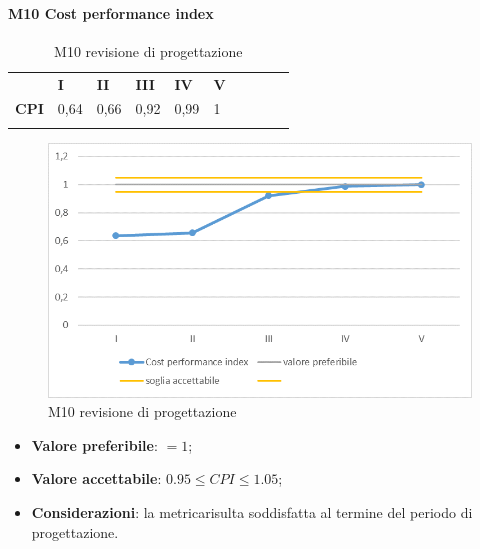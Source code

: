 \paragraph{M10 Cost performance index} \mbox{}
\begin{longtable}[H!] {						
		>{}p{50mm}  		
		>{}p{8mm}
		>{}p{8mm}		
		>{}p{8mm}		
		>{}p{8mm}		
		>{}p{8mm}		
		>{}p{8mm}
		>{}p{8mm}
		>{}p{8mm}
		>{}p{8mm}
	}
	\rowcolor{gray!50}
	\textbf{} & \textbf{I} & \textbf{II} & \textbf{III} & \textbf{IV} & \textbf{V} \TBstrut \\ [2mm]
	\textbf{CPI} & 0,64 & 0,66 & 0,92 & 0,99 & 1 \TBstrut \\ [2mm]
	\rowcolor{white}
	\caption{M10 revisione di progettazione\glo}
\end{longtable}
\begin{figure}[H] 	
\includegraphics[width=\linewidth]{./img/grafici/RP7.png}	
\caption{M10 revisione di progettazione\glo}	
\end{figure}
\begin{itemize}
	\item \textbf{Valore preferibile}: $=1$;
	\item \textbf{Valore accettabile}: $0.95 \le CPI \le 1.05$;
	\item \textbf{Considerazioni}: la metrica\glosp risulta soddisfatta al termine del periodo di progettazione\glo.
\end{itemize}
